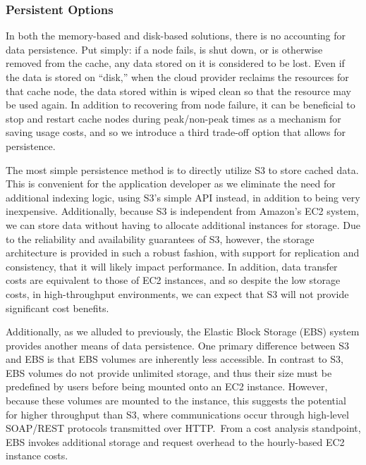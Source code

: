\subsubsection{Persistent Options} %
\label{subsub:persistent_options}
In both the memory-based and disk-based solutions, there is no accounting for
data persistence. Put simply: if a node fails, is shut down, or is otherwise
removed from the cache, any data stored on it is considered to be lost. Even if
the data is stored on ``disk,'' when the cloud provider reclaims the resources
for that cache node, the data stored within is wiped clean so that the resource
may be used again. In addition to recovering from node failure, it can be
beneficial to stop and restart cache nodes during peak/non-peak times as a
mechanism for saving usage costs, and so we introduce a third trade-off option
that allows for persistence.

The most simple persistence method is to directly utilize S3 to store cached
data. This is convenient for the application developer as we eliminate the
need for additional indexing logic, using S3's simple API instead, in addition
to being very inexpensive. Additionally, because S3 is independent from
Amazon's EC2 system, we can store data without having to allocate additional
instances for storage. Due to the reliability and availability guarantees of
S3, however, the storage architecture is provided in such a robust fashion,
with support for replication and consistency, that it will likely impact
performance. In addition, data transfer costs are equivalent to those of EC2
instances, and so despite the low storage costs, in high-throughput
environments, we can expect that S3 will not provide significant cost benefits.

Additionally, as we alluded to previously, the Elastic Block Storage (EBS)
system provides another means of data persistence. One primary difference
between S3 and EBS is that EBS volumes are inherently less accessible. In
contrast to S3, EBS volumes do not provide unlimited storage, and thus their
size must be predefined by users before being mounted onto an EC2 instance.
However, because these volumes are mounted to the instance, this suggests the
potential for higher throughput than S3, where communications occur through
high-level SOAP/REST protocols transmitted over HTTP.\ From a cost analysis
standpoint, EBS invokes additional storage and request overhead to the
hourly-based EC2 instance costs.


